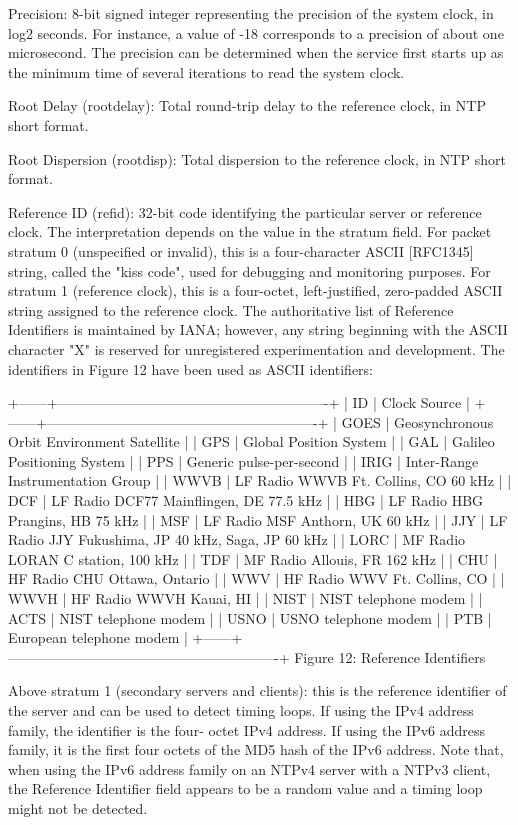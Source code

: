 Precision: 8-bit signed integer representing the precision of the
system clock, in log2 seconds. For instance, a value of -18
corresponds to a precision of about one microsecond. The precision
can be determined when the service first starts up as the minimum
time of several iterations to read the system clock.

Root Delay (rootdelay): Total round-trip delay to the reference
clock, in NTP short format.

Root Dispersion (rootdisp): Total dispersion to the reference clock,
in NTP short format.

Reference ID (refid): 32-bit code identifying the particular server
or reference clock. The interpretation depends on the value in the
stratum field. For packet stratum 0 (unspecified or invalid), this
is a four-character ASCII [RFC1345] string, called the "kiss code",
used for debugging and monitoring purposes. For stratum 1 (reference
clock), this is a four-octet, left-justified, zero-padded ASCII
string assigned to the reference clock. The authoritative list of
Reference Identifiers is maintained by IANA; however, any string
beginning with the ASCII character "X" is reserved for unregistered
experimentation and development. The identifiers in Figure 12 have
been used as ASCII identifiers:

+------+----------------------------------------------------------+
| ID | Clock Source |
+------+----------------------------------------------------------+
| GOES | Geosynchronous Orbit Environment Satellite |
| GPS | Global Position System |
| GAL | Galileo Positioning System |
| PPS | Generic pulse-per-second |
| IRIG | Inter-Range Instrumentation Group |
| WWVB | LF Radio WWVB Ft. Collins, CO 60 kHz |
| DCF | LF Radio DCF77 Mainflingen, DE 77.5 kHz |
| HBG | LF Radio HBG Prangins, HB 75 kHz |
| MSF | LF Radio MSF Anthorn, UK 60 kHz |
| JJY | LF Radio JJY Fukushima, JP 40 kHz, Saga, JP 60 kHz |
| LORC | MF Radio LORAN C station, 100 kHz |
| TDF | MF Radio Allouis, FR 162 kHz |
| CHU | HF Radio CHU Ottawa, Ontario |
| WWV | HF Radio WWV Ft. Collins, CO |
| WWVH | HF Radio WWVH Kauai, HI |
| NIST | NIST telephone modem |
| ACTS | NIST telephone modem |
| USNO | USNO telephone modem |
| PTB | European telephone modem |
+------+----------------------------------------------------------+
Figure 12: Reference Identifiers

Above stratum 1 (secondary servers and clients): this is the
reference identifier of the server and can be used to detect timing
loops. If using the IPv4 address family, the identifier is the four-
octet IPv4 address. If using the IPv6 address family, it is the
first four octets of the MD5 hash of the IPv6 address. Note that,
when using the IPv6 address family on an NTPv4 server with a NTPv3
client, the Reference Identifier field appears to be a random value
and a timing loop might not be detected.

